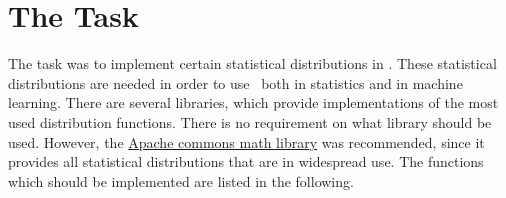 
\chapter*{The Task}

	The task was to implement certain statistical distributions in \setlx. These statistical distributions are needed in order to use \setlx\ both in statistics and in machine learning. There are several libraries, which provide implementations of the most used distribution functions. There is no requirement on what library should be used. However, the \href{http://commons.apache.org/proper/commons-math/index.html}{Apache commons math library} was recommended, since it provides all statistical distributions that are in widespread use. The functions which should be implemented are listed in the following.

